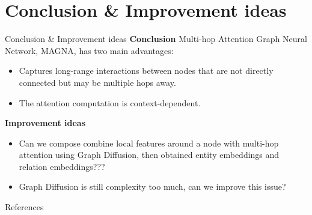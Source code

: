 \documentclass[notheorems, aspectratio=149]{beamer}
\begin{document}
		\section{Conclusion \& Improvement ideas}
		\begin{frame}{Conclusion \& Improvement ideas}
			\textbf{Conclusion} Multi-hop Attention Graph Neural Network, MAGNA, has two main advantages:
			\begin{itemize}
				\item Captures
long-range interactions between nodes that are not directly
connected but may be multiple hops away.
				\item The attention computation is context-dependent.
			\end{itemize}
			\textbf{Improvement ideas}
			\begin{itemize}
				\item Can we compose combine local features around a node with multi-hop attention using Graph Diffusion, then obtained entity embeddings and relation embeddings???
				\item Graph Diffusion is still complexity too much, can we improve this issue?
			\end{itemize}
		\end{frame}
		\begin{frame}{References}
			\nocite{*}
			\newpage\cleardoublepage
			
		\end{frame}
	
\end{document}
